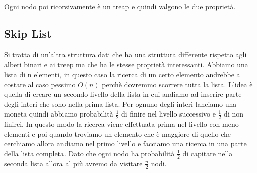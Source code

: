 \documentclass[12pt]{article}
\begin{document}
Ogni nodo poi ricorsivamente è un treap e quindi valgono le due proprietà.

\subsection{Skip List}

Si tratta di un'altra struttura dati che ha una struttura differente rispetto agli alberi binari e ai treep ma che ha le stesse proprietà interessanti.
Abbiamo una lista di n elementi, in questo caso la ricerca di un certo elemento andrebbe a costare al caso pessimo $O(n)$ perchè dovremmo scorrere tutta la lista.
L'idea è quella di creare un secondo livello della lista in cui andiamo ad inserire parte degli interi che sono nella prima lista. Per ognuno degli interi lanciamo una moneta quindi abbiamo probabilità $\frac{1}{2}$ di finire nel livello successivo e $\frac{1}{2}$ di non finirci.
In questo modo la ricerca viene effettuata prima nel livello con meno elementi e poi quando troviamo un elemento che è maggiore di quello che cerchiamo allora andiamo nel primo livello e facciamo una ricerca in una parte della lista completa. Dato che ogni nodo ha probabilità $\frac{1}{2}$ di capitare nella seconda lista allora al più avremo da visitare $\frac{n}{2}$ nodi.
\end{document}

